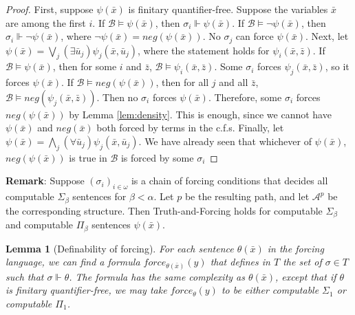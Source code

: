\documentclass{article}
\newtheorem{lem}[thm]{Lemma}
\begin{document}
\begin{proof}

First, suppose $\psi(\bar{x})$ is finitary quantifier-free.  Suppose the variables $\bar{x}$ are among the first $i$.  If $\mathcal{B}\models\psi(\bar{x})$, then $\sigma_i\Vdash\psi(\bar{x})$.  If $\mathcal{B}\models\neg{\psi(\bar{x})}$, then $\sigma_i\Vdash\neg{\psi(\bar{x})}$, where $\neg{\psi(\bar{x})} = neg(\psi(\bar{x}))$.  No $\sigma_j$ can force $\psi(\bar{x})$.  
Next, let $\psi(\bar{x}) = \bigvee_j(\exists\bar{u}_j)\psi_j(\bar{x},\bar{u}_j)$, where the statement holds for $\psi_i(\bar{x},\bar{z})$.  If $\mathcal{B}\models\psi(\bar{x})$, then for some $i$ and $\bar{z}$, $\mathcal{B}\models\psi_i(\bar{x},\bar{z})$.  Some $\sigma_i$ forces $\psi_j(\bar{x},\bar{z})$, so it forces $\psi(\bar{x})$.  If $\mathcal{B}\models neg(\psi(\bar{x}))$, then for all $j$ and all $\bar{z}$, $\mathcal{B}\models neg(\psi_j(\bar{x},\bar{z}))$.  Then no $\sigma_i$ forces $\psi(\bar{x})$.  Therefore, some $\sigma_i$ forces $neg(\psi(\bar{x}))$ by Lemma \ref{lem:density}.  
This is enough, since we cannot have $\psi(\bar{x})$ and $neg(\bar{x})$ both forced by terms in the c.f.s.  Finally, let $\psi(\bar{x}) = \bigwedge_j(\forall\bar{u}_j)\psi_j(\bar{x},\bar{u}_j)$.  We have already seen that whichever of $\psi(\bar{x})$, $neg(\psi(\bar{x}))$ is true in $\mathcal{B}$ is forced by some $\sigma_i$     
\end{proof} 

\noindent
\textbf{Remark}:  Suppose $(\sigma_i)_{i\in\omega}$ is a chain of forcing conditions that decides all computable $\Sigma_\beta$ sentences for $\beta < \alpha$.  Let $p$ be the resulting path, and let $\mathcal{A}^p$ be the corresponding structure.  Then Truth-and-Forcing holds for computable $\Sigma_\beta$ and computable $\Pi_\beta$ sentences $\psi(\bar{x})$.  

\begin{lem} [Definability of forcing]  

For each sentence $\theta(\bar{x})$ in the forcing language, we can find a formula $force_{\theta(\bar{x})}(y)$ that defines in $T$ the set of $\sigma\in T$ such that $\sigma\Vdash\theta$.  The formula has the same complexity as $\theta(\bar{x})$, except that if $\theta$ is finitary quantifier-free, we may take $force_\theta(y)$ to be either computable $\Sigma_1$ or computable $\Pi_1$.  

\end{lem} 
\end{document}
